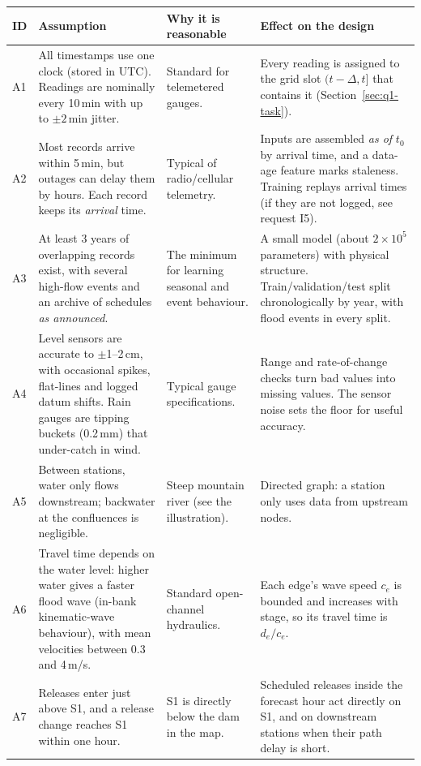 {\small
\begin{longtable}{@{}p{}p{}p{}p{}@{}}
\toprule
ID & Assumption & Why it is reasonable & Effect on the design \\ \midrule
\endhead
A1 & All timestamps use one clock (stored in UTC). Readings are nominally every 10\,min with up to $\pm 2$\,min jitter. & Standard for telemetered gauges. & Every reading is assigned to the grid slot $(t-\Delta, t]$ that contains it (Section~\ref{sec:q1-task}). \\
A2 & Most records arrive within 5\,min, but outages can delay them by hours. Each record keeps its \emph{arrival} time. & Typical of radio/cellular telemetry. & Inputs are assembled \emph{as of} $t_0$ by arrival time, and a data-age feature marks staleness. Training replays arrival times (if they are not logged, see request I5). \\
A3 & At least 3 years of overlapping records exist, with several high-flow events and an archive of schedules \emph{as announced}. & The minimum for learning seasonal and event behaviour. & A small model (about $2\times10^5$ parameters) with physical structure. Train/validation/test split chronologically by year, with flood events in every split. \\
A4 & Level sensors are accurate to $\pm$1--2\,cm, with occasional spikes, flat-lines and logged datum shifts. Rain gauges are tipping buckets (0.2\,mm) that under-catch in wind. & Typical gauge specifications. & Range and rate-of-change checks turn bad values into missing values. The sensor noise sets the floor for useful accuracy. \\
A5 & Between stations, water only flows downstream; backwater at the confluences is negligible. & Steep mountain river (see the illustration). & Directed graph: a station only uses data from upstream nodes. \\
A6 & Travel time depends on the water level: higher water gives a faster flood wave (in-bank kinematic-wave behaviour), with mean velocities between 0.3 and 4\,m/s. & Standard open-channel hydraulics. & Each edge's wave speed $c_e$ is bounded and increases with stage, so its travel time is $d_e/c_e$. \\
A7 & Releases enter just above S1, and a release change reaches S1 within one hour. & S1 is directly below the dam in the map. & Scheduled releases inside the forecast hour act directly on S1, and on downstream stations when their path delay is short. \\

\end{longtable}}
